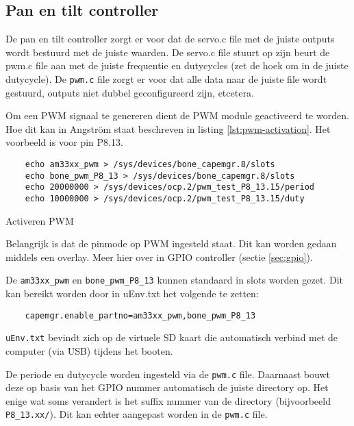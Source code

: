 \subsection{Pan en tilt controller}

De pan en tilt controller zorgt er voor dat de servo.c file met de juiste outputs
wordt bestuurd met de juiste waarden. De servo.c file stuurt op zijn beurt de pwm.c
file aan met de juiste frequentie en dutycycles (zet de hoek om in de juiste
dutycycle). De \texttt{pwm.c} file zorgt er voor dat alle data naar de juiste
file wordt gestuurd, outputs niet dubbel geconfigureerd zijn, etcetera.

Om een PWM signaal te genereren dient de PWM module geactiveerd te worden. Hoe
dit kan in Angström staat beschreven in listing \ref{lst:pwm-activation}. Het
voorbeeld is voor pin P8.13.

\begin{listing}
    \begin{verbatim}
    echo am33xx_pwm > /sys/devices/bone_capemgr.8/slots
    echo bone_pwm_P8_13 > /sys/devices/bone_capemgr.8/slots
    echo 20000000 > /sys/devices/ocp.2/pwm_test_P8_13.15/period
    echo 10000000 > /sys/devices/ocp.2/pwm_test_P8_13.15/duty
    \end{verbatim}
    \caption{Activeren PWM}
    \label{lst:pwm-activation}
\end{listing}


Belangrijk is dat de pinmode op PWM ingesteld staat. Dit kan worden gedaan
middels een overlay. Meer hier over in GPIO controller (sectie \ref{sec:gpio}).

De \texttt{am33xx\_pwm} en \texttt{bone\_pwm\_P8\_13} kunnen standaard in slots
worden gezet. Dit kan bereikt worden door in uEnv.txt het volgende te zetten:

\begin{verbatim}
    capemgr.enable_partno=am33xx_pwm,bone_pwm_P8_13
\end{verbatim}

\texttt{uEnv.txt} bevindt zich op de virtuele SD kaart die automatisch verbind
met de computer (via USB) tijdens het booten.

De periode en dutycycle worden ingesteld via de \texttt{pwm.c} file. Daarnaast
bouwt deze op basis van het GPIO nummer automatisch de juiste directory op. Het
enige wat soms verandert is het suffix nummer van de directory (bijvoorbeeld
\texttt{P8\_13.xx/}). Dit kan echter aangepast worden in de \texttt{pwm.c} file.
